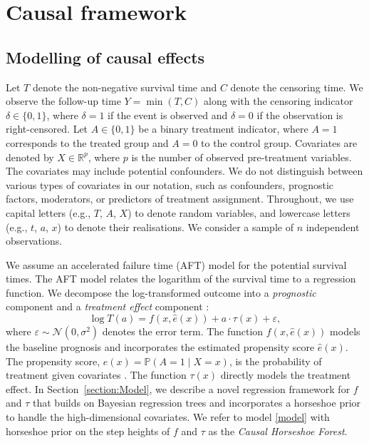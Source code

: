 \section{Causal framework}\label{sec:context}


\subsection{Modelling of causal effects}

Let $T$ denote the non-negative survival time and $C$ denote the censoring time. 
We observe the follow-up time $Y = \min(T, C)$ along with the censoring indicator $\delta \in \{0,1\}$, where $\delta = 1$ if the event is observed and $\delta = 0$ if the observation is right-censored.
Let $A \in \{0,1\}$ be a binary treatment indicator, where $A = 1$ corresponds to the treated group and $A = 0$ to the control group. 
Covariates are denoted by $X \in \mathbb{R}^p$, where $p$ is the number of observed pre-treatment variables.
The covariates may include potential confounders.
We do not distinguish between various types of covariates in our notation, such as confounders, prognostic factors, moderators, or predictors of treatment assignment.
Throughout, we use capital letters (e.g., $T$, $A$, $X$) to denote random variables, and lowercase letters (e.g., $t$, $a$, $x$) to denote their realisations. 
We consider a sample of $n$ independent observations. 

We assume an accelerated failure time (AFT) model \citep{buckley1979linear} for the potential survival times. 
The AFT model relates the logarithm of the survival time to a regression function.
We decompose the log-transformed outcome into a \textit{prognostic} component and a \textit{treatment effect} component \citep{hahn2020bayesian}:
\begin{equation}\label{model}
    \log T(a) = f(x, \hat{e}(x)) + a \cdot \tau(x) + \varepsilon,
\end{equation}
where $\varepsilon \sim \mathcal{N}(0, \sigma^2)$ denotes the error term. 
The function $f(x, \hat{e}(x))$ models the baseline prognosis and incorporates the estimated propensity score $\hat{e}(x)$.
The propensity score, $e(x) = \mathbb{P}(A = 1 \mid X = x)$, is the probability of treatment given covariates \citep{RosenbaumRubin1983}.
The function $\tau(x)$ directly models the treatment effect.
In Section~\ref{section:Model}, we describe a novel regression framework for $f$ and $\tau$ that builds on Bayesian regression trees and incorporates a horseshoe prior to handle the high-dimensional covariates.
We refer to model \eqref{model} with horseshoe prior on the step heights of $f$ and $\tau$ as the \textsl{Causal Horseshoe Forest}.


